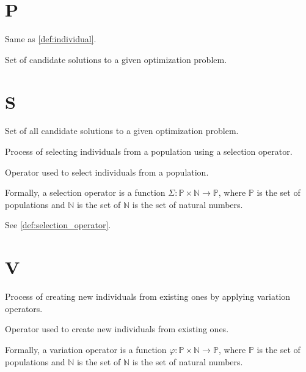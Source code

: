   \section*{P}
    \begin{definition}[Phenotype]
    \label{def:phenotype}
      Same as \vref{def:individual}.
    \end{definition}

    \begin{definition}[Population]
    \label{def:population}
      Set of candidate solutions to a given optimization problem.
    \end{definition}

  \section*{S}
    \begin{definition}
    \label{def:search_space}
      Set of all candidate solutions to a given optimization problem.
    \end{definition}
    
    \begin{definition}[Selection]
    \label{def:selection}
      Process of selecting individuals from a population using a selection operator.
    \end{definition}

    \begin{definition}
    \label{def:selection_operator}
      Operator used to select individuals from a population.

      Formally, a selection operator is a function \(\Sigma : \mathbb{P} \times \mathbb{N} \to
      \mathbb{P}\), where \(\mathbb{P}\) is the set of populations and \(\mathbb{N}\) is the set of
      \(\mathbb{N}\) is the set of natural numbers.
    \end{definition}

    \begin{definition}[Selector]
      See \vref{def:selection_operator}.
    \end{definition}

  \section*{V}
    \begin{definition}[Variation]
    \label{def:variation}
      Process of creating new individuals from existing ones by applying variation operators.
    \end{definition}

    \begin{definition}
    \label{def:variation_operator}
      Operator used to create new individuals from existing ones.

      Formally, a variation operator is a function \(\varphi : \mathbb{P} \times \mathbb{N} \to
      \mathbb{P}\), where \(\mathbb{P}\) is the set of populations and \(\mathbb{N}\) is the set of
      \(\mathbb{N}\) is the set of natural numbers.
    \end{definition}
